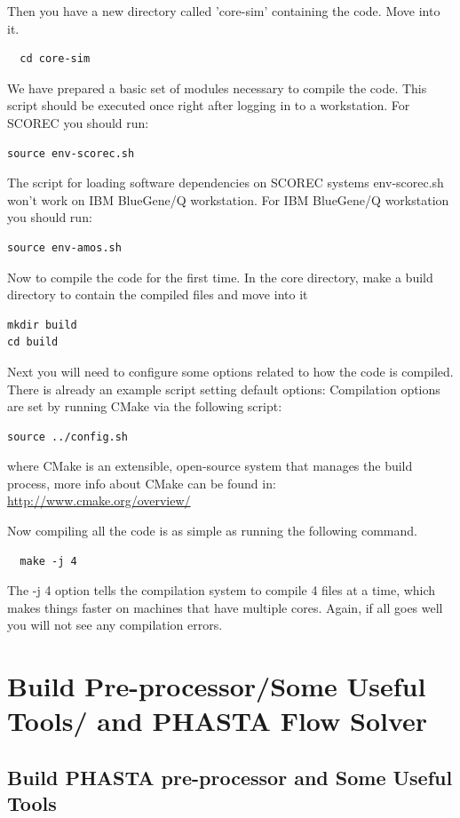 \documentclass{article}
\begin{document}
Then you have a new directory called 'core-sim' containing the code. Move into it.
\begin{lstlisting}
  cd core-sim
\end{lstlisting}

We have prepared a basic set of modules necessary to compile the code. This script should be executed once right after logging in to a workstation. For SCOREC you should run:
\begin{lstlisting}
source env-scorec.sh
\end{lstlisting}
The script for loading software dependencies on SCOREC systems env-scorec.sh won't work on IBM BlueGene/Q workstation. For IBM BlueGene/Q workstation you should run:
\begin{lstlisting}
source env-amos.sh
\end{lstlisting}

Now to compile the code for the first time. In the core directory, make a build directory to contain the compiled files and move into it
\begin{lstlisting} 
mkdir build
cd build
\end{lstlisting}

Next you will need to configure some options related to how the code is compiled. There is already an example script setting default options:
Compilation options are set by running CMake via the following script:
\begin{lstlisting}
source ../config.sh
\end{lstlisting}
where CMake is an extensible, open-source system that manages the build process, more info about CMake can be found in:\\
\url{http://www.cmake.org/overview/}

Now compiling all the code is as simple as running the following command.
\begin{lstlisting}
  make -j 4
  \end{lstlisting}

The -j 4 option tells the compilation system to compile 4 files at a time, which makes things faster on machines that have multiple cores.
Again, if all goes well you will not see any compilation errors.

\section{Build Pre-processor/Some Useful Tools/ and PHASTA Flow Solver}

\subsection{Build PHASTA pre-processor and Some Useful Tools}
\end{document}
